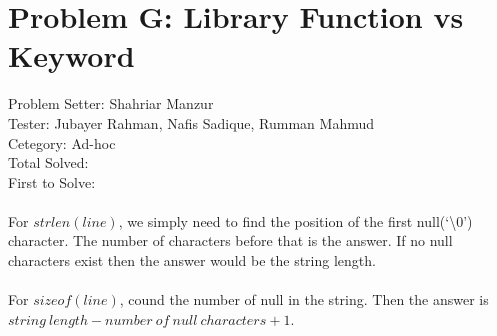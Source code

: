 \section*{Problem G: Library Function vs Keyword}
Problem Setter: Shahriar Manzur \\
Tester: Jubayer Rahman, Nafis Sadique, Rumman Mahmud \\
Cetegory: Ad-hoc \\
Total Solved:  \\
First to Solve: \\
\\
For $strlen(line)$, we simply need to find the position of the first null(`\textbackslash 0') character.
The number of characters before that is the answer. If no null characters exist then
the answer would be the string length.
\\ \\
For $sizeof(line)$, cound the number of null in the string. Then the answer is 
$string\ length - number\ of\ null\ characters + 1$.

